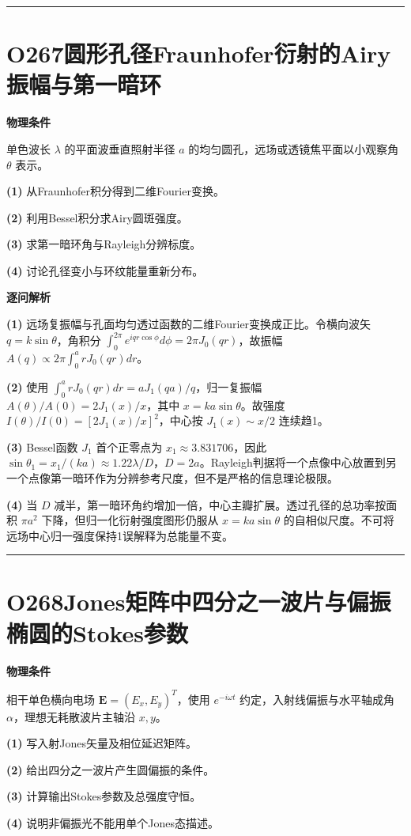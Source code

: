 \documentclass[UTF8,a4paper,11pt,oneside,openany]{ctexbook}
\begin{document}
\par\bigskip\hrule\bigskip
\section*{O267\quad 圆形孔径Fraunhofer衍射的Airy振幅与第一暗环}
\textbf{物理条件}\par 单色波长 \(\lambda\) 的平面波垂直照射半径 \(a\) 的均匀圆孔，远场或透镜焦平面以小观察角 \(\theta\) 表示。
\par\noindent\textbf{(1)} 从Fraunhofer积分得到二维Fourier变换。
\par\noindent\textbf{(2)} 利用Bessel积分求Airy圆斑强度。
\par\noindent\textbf{(3)} 求第一暗环角与Rayleigh分辨标度。
\par\noindent\textbf{(4)} 讨论孔径变小与环纹能量重新分布。

\par\medskip\noindent\textbf{逐问解析}
\par\noindent\textbf{(1)} 远场复振幅与孔面均匀透过函数的二维Fourier变换成正比。令横向波矢 \(q=k\sin\theta\)，角积分 \(\int_0^{2\pi}e^{iqr\cos\phi}d\phi=2\pi J_0(qr)\)，故振幅 \(A(q)\propto2\pi\int_0^arJ_0(qr)dr\)。
\par\noindent\textbf{(2)} 使用 \(\int_0^arJ_0(qr)dr=aJ_1(qa)/q\)，归一复振幅 \(A(\theta)/A(0)=2J_1(x)/x\)，其中 \(x=ka\sin\theta\)。故强度 \(I(\theta)/I(0)=[2J_1(x)/x]^2\)，中心按 \(J_1(x)\sim x/2\) 连续趋1。
\par\noindent\textbf{(3)} Bessel函数 \(J_1\) 首个正零点为 \(x_1\approx3.831706\)，因此 \(\sin\theta_1=x_1/(ka)\approx1.22\lambda/D\)，\(D=2a\)。Rayleigh判据将一个点像中心放置到另一个点像第一暗环作为分辨参考尺度，但不是严格的信息理论极限。
\par\noindent\textbf{(4)} 当 \(D\) 减半，第一暗环角约增加一倍，中心主瓣扩展。透过孔径的总功率按面积 \(\pi a^2\) 下降，但归一化衍射强度图形仍服从 \(x=ka\sin\theta\) 的自相似尺度。不可将远场中心归一强度保持1误解释为总能量不变。

\par\bigskip\hrule\bigskip
\section*{O268\quad Jones矩阵中四分之一波片与偏振椭圆的Stokes参数}
\textbf{物理条件}\par 相干单色横向电场 \(\boldsymbol E=(E_x,E_y)^T\)，使用 \(e^{-i\omega t}\) 约定，入射线偏振与水平轴成角 \(\alpha\)，理想无耗散波片主轴沿 \(x,y\)。
\par\noindent\textbf{(1)} 写入射Jones矢量及相位延迟矩阵。
\par\noindent\textbf{(2)} 给出四分之一波片产生圆偏振的条件。
\par\noindent\textbf{(3)} 计算输出Stokes参数及总强度守恒。
\par\noindent\textbf{(4)} 说明非偏振光不能用单个Jones态描述。
\end{document}
